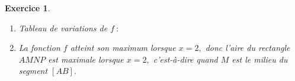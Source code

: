\documentclass[10pt]{article}
\newtheorem{exo}{Exercice}
\begin{document}
\begin{exo}
\begin{enumerate}
\begin{enumerate}
\item Tableau de variations de $f~:$ 

\begin{center}
\end{center}
\item La fonction $f$ atteint son maximum lorsque $x=2,$ donc l’aire du rectangle $AMNP$ est maximale lorsque $x=2,$ c'est-à-dire quand $M$ est le milieu du segment $\left[AB\right].$
\end{enumerate}
\end{enumerate}

\end{exo}
\end{document}
